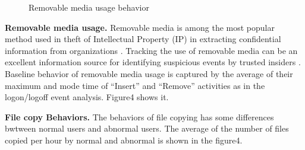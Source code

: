 \documentclass[conference]{IEEEtran}
\begin{document}
\begin{figure}[!t]
\centering
{} 
\caption{ Removable media usage behavior }
\label{fig5}
\end{figure}

\textbf{Removable media usage.}
Removable media is among the most popular method used in theft of Intellectual Property (IP) in extracting confidential information from organizations \cite{b41}. Tracking the use of removable media can be an excellent information source for identifying suspicious events by trusted insiders . Baseline behavior of removable media usage is captured by the average of their maximum and mode time of “Insert” and “Remove” activities as in the logon/logoff event analysis. Figure4 shows it.

\textbf{File copy Behaviors.}
The behaviors of file copying has some differences bwtween normal users and abnormal users.
The average of the number of files copied per hour by normal and abnormal is shown in the figure4. 
\end{document}
